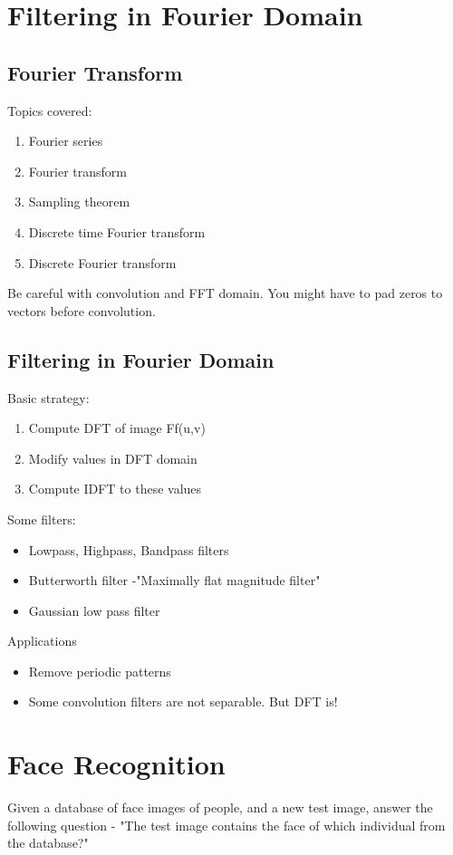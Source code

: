 \documentclass[a4paper,11pt]{article}
\begin{document}
\section{Filtering in Fourier Domain}
\subsection{Fourier Transform}
Topics covered:
\begin{enumerate}
\item Fourier series
\item Fourier transform
\item Sampling theorem
\item Discrete time Fourier transform
\item Discrete Fourier transform
\end{enumerate}
Be careful with convolution and FFT domain. You might have to pad zeros to vectors before convolution.
\subsection{Filtering in Fourier Domain}
Basic strategy:
\begin{enumerate}
\item Compute DFT of image Ff(u,v)
\item Modify values in DFT domain
\item Compute IDFT to these values
\end{enumerate}
Some filters:
\begin{itemize}
\item Lowpass, Highpass, Bandpass filters
\item Butterworth filter -"Maximally flat magnitude filter"
\item Gaussian low pass filter
\end{itemize}
Applications
\begin{itemize}
\item Remove periodic patterns
\item Some convolution filters are not separable. But DFT is! 

\end{itemize}

\section{Face Recognition}
Given a database of face images of people, and a new test image, answer the following question - "The test image contains the face of which individual from the database?"
\end{document}
